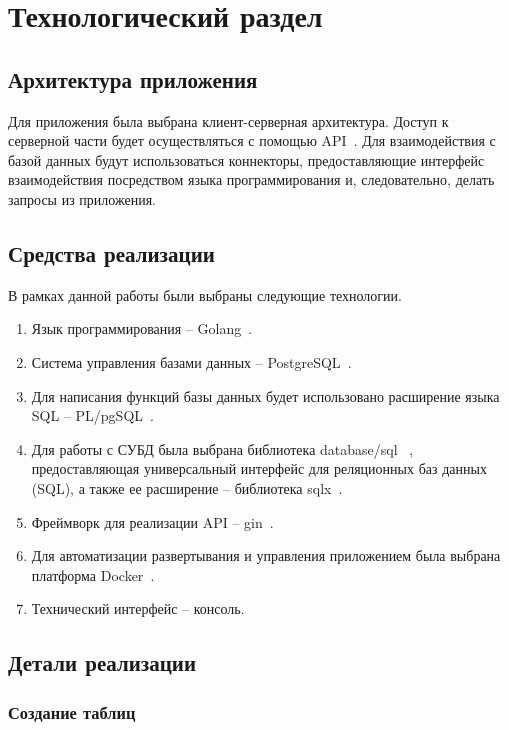 \section{Технологический раздел}

\subsection{Архитектура приложения}

Для приложения была выбрана клиент-серверная архитектура. Доступ к серверной части будет осуществляться с помощью API~\cite{api}. Для взаимодействия с базой данных будут использоваться коннекторы, предоставляющие интерфейс взаимодействия посредством языка программирования и, следовательно,  делать запросы из приложения.

\subsection{Средства реализации}

В рамках данной работы были выбраны следующие технологии.
\begin{enumerate}[label=---]
	\item Язык программирования -- Golang~\cite{go}.
	\item Система управления базами данных -- PostgreSQL~\cite{postgres}. 
	\item Для написания функций базы данных будет использовано расширение языка SQL -- PL/pgSQL~\cite{pgSQL}.
	\item Для работы с СУБД была выбрана библиотека database/sql ~\cite{go-sql}, предоставляющая универсальный интерфейс для реляционных баз данных (SQL), а также ее расширение -- библиотека sqlx~\cite{sqlx}.
	\item Фреймворк для реализации API -- gin~\cite{gin}.
	\item Для автоматизации развертывания и управления приложением была выбрана платформа Docker~\cite{docker}. 
	\item Технический интерфейс -- консоль. 
\end{enumerate}

\subsection{Детали реализации}


\subsubsection{Создание таблиц}




